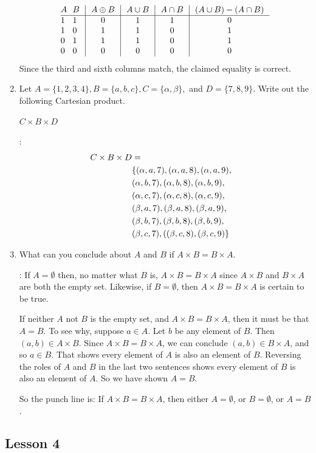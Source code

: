 \documentclass[11pt]{amsart}
\begin{document}
\begin{enumerate}
$$\vbox{\offinterlineskip
\halign { \strut # & # & \vrule ~~# & \vrule ~~# & \vrule ~~# & \vrule ~~# \cr
$A$ & $B$ & $A\oplus B$ & $A\cup B$ & $A\cap B$ & $(A\cup B) - (A\cap B)$ \cr
\noalign{\hrule}
1   &  1   &  0  &  1 & 1 & 0  \cr
1   &  0   &  1  &  1 & 0 & 1  \cr
0   &  1   &  1  &  1 & 0 & 1  \cr
0   &  0   &  0  &  0 & 0 & 0 \cr}
}$$
Since the third and sixth columns match, the claimed equality is correct.

\item Let $A=\{1,2,3,4\}, B=\{a, b, c\}, C=\{\alpha, \beta\}, $ and $D=\{7,8,9\}$.
Write out the following Cartesian product.

 $C\times B\times D$
 
 : 
 \begin{align*}\openup 7pt
 C\times B\times D &=\cr
&\{(\alpha, a, 7), (\alpha, a, 8), (\alpha, a, 9),\cr
&(\alpha, b, 7), (\alpha, b, 8), (\alpha, b, 9),\cr
&(\alpha, c, 7), (\alpha, c, 8), (\alpha, c, 9),\cr
&(\beta, a, 7), (\beta, a, 8), (\beta, a, 9),\cr
&(\beta, b, 7), (\beta, b, 8), (\beta, b, 9),\cr
&(\beta, c, 7), ((\beta, c, 8), (\beta, c, 9)\}\cr
\end{align*}

\item What can you conclude about $A$ and $B$ if $A\times B = B\times A$.

: If  $A=\emptyset$ then, no matter what $B$ is, $A\times B=B\times A$
since $A\times B$ and $B\times A$ are both  the empty set. Likewise, if $B=\emptyset$, then
$A\times B = B\times A$ is certain to be true. 

If neither $A$ not $B$ is the empty set, and $A\times B = B\times A$, then it must be that
$A=B$. To see why, suppose $a\in A$. Let $b$ be any element of $B$. Then $(a,b)\in A\times B$.
Since $A\times B = B\times A$, we can conclude $(a,b)\in B\times A$, and so $a\in B$. That
shows every element of $A$ is also an element of $B$. Reversing the roles of $A$ and $B$
in the last two sentences shows every element of $B$ is also an element of $A$. So we
have shown $A=B$.

So the punch line is: If $A\times B = B\times A$, then either $A=\emptyset$, or $B=\emptyset$,
or $A=B$. 

\end{enumerate}

\subsection{Lesson 4}
\end{document}
